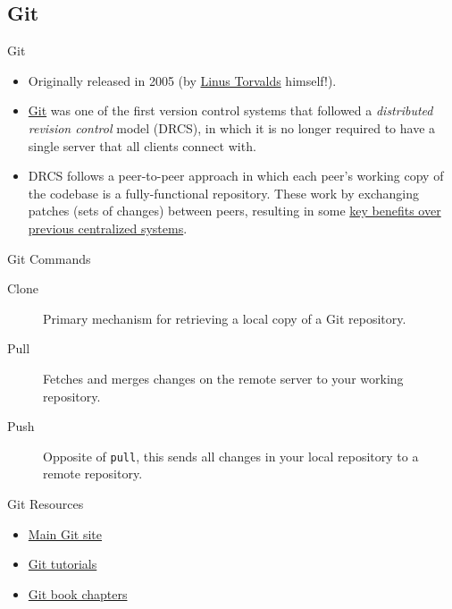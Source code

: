 \subsection{Git}

\begin{frame}{Git}
\begin{itemize}
\item Originally released in 2005 (by
\href{https://en.wikipedia.org/wiki/Linus_Torvalds}{Linus Torvalds}
himself!).
\item \href{https://en.wikipedia.org/wiki/Git_(software)}{Git} was 
one of the first version control systems that followed a
\emph{distributed revision control} model (DRCS), in which it is no
longer required to have a single server that all clients connect with.
\item DRCS follows a peer-to-peer approach in which each peer's
working copy of the codebase is a fully-functional repository. These
work by exchanging patches (sets of changes) between peers, resulting in
some
\href{https://en.wikipedia.org/wiki/Distributed_revision_control\#Distributed_vs._centralized}{key
benefits over previous centralized systems}.
\end{itemize}
\end{frame}


\begin{frame}{Git Commands}
\begin{description}
\item[Clone] Primary mechanism for retrieving
  a local copy of a Git repository.
\item[Pull] Fetches and merges changes on the remote
  server to your working repository.
\item[Push] Opposite of \texttt{pull}, this sends all
  changes in your local repository to a remote repository.
\end{description}
\end{frame}

\begin{frame}{Git Resources}

\begin{itemize}
\item
  \href{http://git-scm.com/}{Main Git site}
\item
  \href{http://www.atlassian.com/git/tutorial}{Git tutorials}
\item
  \href{http://git-scm.com/book}{Git book chapters}
\end{itemize}
\end{frame}

